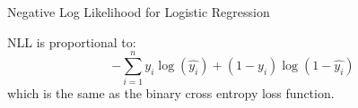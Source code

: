 \documentclass{beamer}
\begin{document}
\begin{frame}{Negative Log Likelihood for Logistic Regression}
    \begin{tcolorbox}[colback=metropolisblue!5,colframe=metropolisblue,title=Negative Log Likelihood for Logistic Regression]
        NLL is proportional to:
        \begin{equation*}
            -\sum_{i=1}^n y_i\log(\hat{y_i}) + (1-y_i)\log(1-\hat{y_i})
        \end{equation*}
        which is the same as the binary cross entropy loss function.
    \end{tcolorbox}
    
\end{frame}

\end{document}
